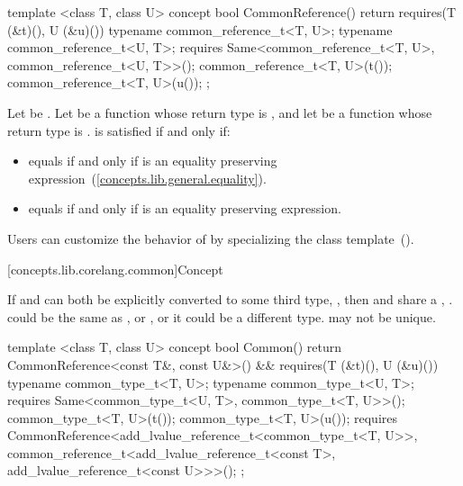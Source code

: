 %
\begin{itemdecl}
template <class T, class U>
concept bool CommonReference() {
  return requires(T (&t)(), U (&u)()) {
    typename common_reference_t<T, U>;
    typename common_reference_t<U, T>;
    requires Same<common_reference_t<T, U>,
                  common_reference_t<U, T>>();
    common_reference_t<T, U>(t());
    common_reference_t<T, U>(u());
  };
}
\end{itemdecl}

\begin{itemdescr}
\pnum
Let  be . Let  be a
function whose return type is , and let  be a function
whose return type is .  is satisfied
if and only if:
\begin{itemize}
\item {} equals  if and only if  is an
  equality preserving expression~(\ref{concepts.lib.general.equality}).
\item {} equals  if and only if  is an
  equality preserving expression.
\end{itemize}

\pnum
\enternote Users can customize the behavior of  by specializing the
 class template~().\exitnote
\end{itemdescr}

[concepts.lib.corelang.common]{Concept }

\pnum
If  and  can both be explicitly converted to some third type,
, then  and  share a ,
. \enternote {} could be the same as , or , or
it could be a different type.  may not be unique.\exitnote

%
\begin{itemdecl}
template <class T, class U>
concept bool Common() {
  return CommonReference<const T&, const U&>() &&
    requires(T (&t)(), U (&u)()) {
      typename common_type_t<T, U>;
      typename common_type_t<U, T>;
      requires Same<common_type_t<U, T>, common_type_t<T, U>>();
      common_type_t<T, U>(t());
      common_type_t<T, U>(u());
      requires CommonReference<add_lvalue_reference_t<common_type_t<T, U>>,
                               common_reference_t<add_lvalue_reference_t<const T>,
                                                  add_lvalue_reference_t<const U>>>();
    };
}
\end{itemdecl}

